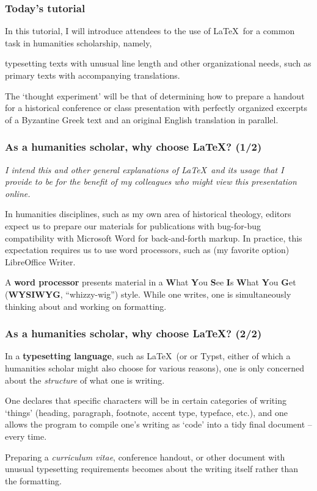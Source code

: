 \documentclass[aspectratio=169]{beamer}
\begin{document}
\begin{frame}
	\frametitle[Tutorial]{Today's tutorial}
In this tutorial, I will introduce attendees to the use of \LaTeX\ for a common task in humanities scholarship, namely, \break

typesetting texts with unusual line length and other organizational needs, such as primary texts with accompanying translations. \break

The `thought experiment' will be that of determining how to prepare a handout for a historical conference or class presentation with perfectly organized excerpts of a Byzantine Greek text and an original English translation in parallel. \break
\end{frame}

\begin{frame}
	\frametitle[\LaTeX]{As a humanities scholar, why choose \LaTeX ? {\scriptsize (1/2)} }
	
\begin{flushright}
	\textit{I intend this and other general explanations of \LaTeX\ \break and its usage that I provide to be for the benefit of my \break colleagues who might view this presentation online.}\break
\end{flushright}

In humanities disciplines, such as my own area of historical theology, editors expect us to prepare our materials for publications with bug-for-bug compatibility with Microsoft Word for back-and-forth markup. In practice, this expectation requires us to use word processors, such as (my favorite option) LibreOffice Writer. \break

A \textbf{word processor} presents material in a \textbf{W}hat \textbf{Y}ou \textbf{S}ee \textbf{I}s \textbf{W}hat \textbf{Y}ou \textbf{G}et (\textbf{WYSIWYG}, ``whizzy-wig'') style. While one writes, one is simultaneously thinking about and working on formatting.

\end{frame}

\begin{frame}
	\frametitle[\LaTeX]{As a humanities scholar, why choose \LaTeX ? {\scriptsize (2/2)} }
	
In a \textbf{typesetting language}, such as \LaTeX\ (or  or Typst, either of which a humanities scholar might also choose for various reasons), one is only concerned about the \emph{structure} of what one is writing. \break

One declares that specific characters will be in certain categories of writing `things' (heading, paragraph, footnote, accent type, typeface, etc.), and one allows the program to compile one's writing as `code' into a tidy final document -- every time. \break

Preparing a \textit{curriculum vitae}, conference handout, or other document with unusual typesetting requirements becomes about the writing itself rather than the formatting.
	
\end{frame}
\end{document}
